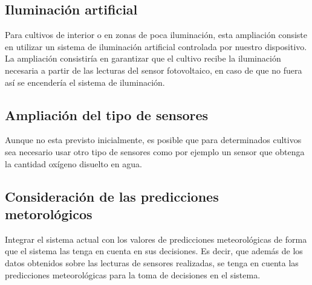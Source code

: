 \documentclass[12pt,a4paper,titlepage,oneside]{report}
\begin{document}
	\subsection*{Iluminación artificial}
	Para cultivos de interior o en zonas de poca iluminación, esta ampliación consiste en utilizar un sistema de iluminación artificial controlada por nuestro dispositivo. La ampliación consistiría en garantizar que el cultivo recibe la iluminación necesaria a partir de las lecturas del sensor fotovoltaico, en caso de que no fuera así se encendería el sistema de iluminación.


	\subsection*{Ampliación del tipo de sensores}
	Aunque no esta previsto inicialmente, es posible que para determinados cultivos sea necesario usar otro tipo de sensores como por ejemplo un sensor que obtenga la cantidad oxígeno disuelto en agua.

	\subsection*{Consideración de las predicciones metorológicos}
	Integrar el sistema actual con los valores de predicciones meteorológicas de forma que el sistema las tenga en cuenta en sus decisiones. Es decir, que además de los datos obtenidos sobre las lecturas de sensores realizadas, se tenga en cuenta las predicciones meteorológicas para la toma de decisiones en el sistema.
	
\newpage
{}


\end{document}
